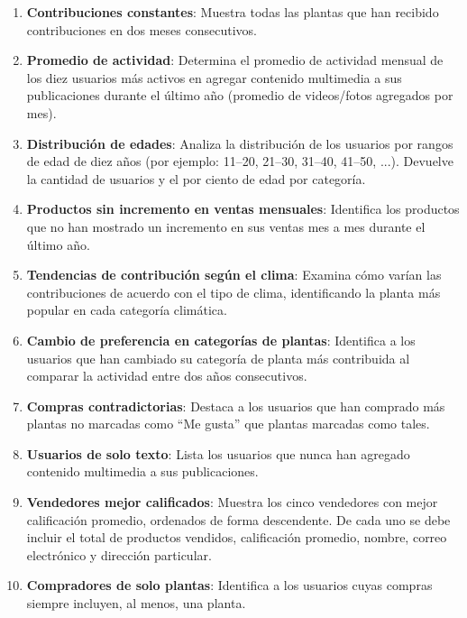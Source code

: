 \documentclass[10pt]{article}
\begin{document}
\begin{enumerate}
\begin{enumerate}
			\item \textbf{Contribuciones constantes}: Muestra todas las plantas que han recibido contribuciones en dos meses consecutivos.
			
			\item \textbf{Promedio de actividad}: Determina el promedio de actividad mensual de los diez usuarios más activos en agregar contenido multimedia a sus publicaciones durante el último año (promedio de videos/fotos agregados por mes).
			
			\item \textbf{Distribución de edades}: Analiza la distribución de los usuarios por rangos de edad de diez años (por ejemplo: 11–20, 21–30, 31–40, 41–50, ...). Devuelve la cantidad de usuarios y el por ciento de edad por categoría.
			
			\item \textbf{Productos sin incremento en ventas mensuales}: Identifica los productos que no han mostrado un incremento en sus ventas mes a mes durante el último año.
			
			\item \textbf{Tendencias de contribución según el clima}: Examina cómo varían las contribuciones de acuerdo con el tipo de clima, identificando la planta más popular en cada categoría climática.
			
			\item \textbf{Cambio de preferencia en categorías de plantas}: Identifica a los usuarios que han cambiado su categoría de planta más contribuida al comparar la actividad entre dos años consecutivos.
			
			\item \textbf{Compras contradictorias}: Destaca a los usuarios que han comprado más plantas no marcadas como “Me gusta” que plantas marcadas como tales.
			
			\item \textbf{Usuarios de solo texto}: Lista los usuarios que nunca han agregado contenido multimedia a sus publicaciones.
			
			\item \textbf{Vendedores mejor calificados}: Muestra los cinco vendedores con mejor calificación promedio, ordenados de forma descendente. De cada uno se debe incluir el total de productos vendidos, calificación promedio, nombre, correo electrónico y dirección particular.
			
			\item \textbf{Compradores de solo plantas}: Identifica a los usuarios cuyas compras siempre incluyen, al menos, una planta.
			

\end{enumerate}
\end{enumerate}
\end{document}
